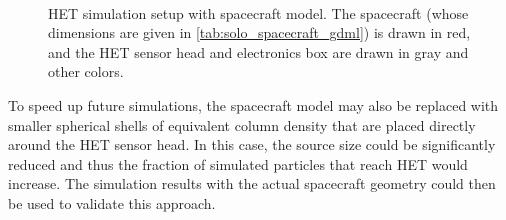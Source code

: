 \begin{figure}
{\begin{tikzpicture}
        \end{tikzpicture}
        \label{subfig:het_simulation_setup_sideview}
    }\\
    \caption[\acs{HET} simulation setup with spacecraft model]{\ac{HET} simulation setup with spacecraft model. The spacecraft (whose dimensions are given in \autoref{tab:solo_spacecraft_gdml}) is drawn in red, and the \ac{HET} sensor head and electronics box are drawn in gray and other colors.}
    \label{fig:het_simulation_setup}
\end{figure}

To speed up future simulations, the spacecraft model may also be replaced with smaller spherical shells of equivalent column density that are placed directly around the \ac{HET} sensor head. In this case, the source size could be significantly reduced and thus the fraction of simulated particles that reach \ac{HET} would increase. The simulation results with the actual spacecraft geometry could then be used to validate this approach.

